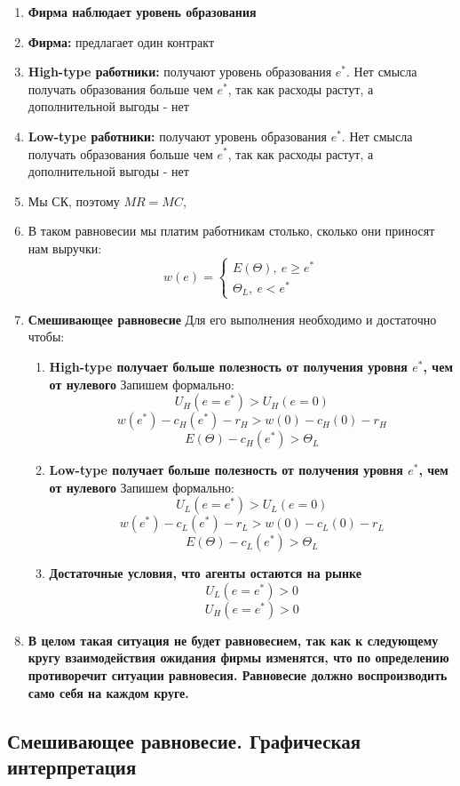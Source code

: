 \begin{enumerate}
    \item \textbf{Фирма наблюдает уровень образования}
    \item \textbf{Фирма:} предлагает один контракт
    \item \textbf{High-type работники:} получают уровень образования $e^*$. Нет смысла получать образования больше чем $e^*$, так как расходы растут, а дополнительной выгоды - нет
    \item \textbf{Low-type работники:} получают уровень образования $e^*$. Нет смысла получать образования больше чем $e^*$, так как расходы растут, а дополнительной выгоды - нет
    \item Мы СК, поэтому $MR=MC$,
    \item В таком равновесии мы платим работникам столько, сколько они приносят нам выручки: $$w(e)=\begin{cases}
        E(\Theta), \ e \geq e^* \\
        \Theta_L, \ e < e^*
    \end{cases}$$
    \item \textbf{Смешивающее равновесие} Для его выполнения необходимо и достаточно чтобы:\begin{enumerate}
        \item \textbf{High-type получает больше полезность от получения уровня $e^*$, чем от нулевого} Запишем формально:$$U_H(e=e^*)>U_H(e=0)$$
        $$w(e^*)-c_H(e^*)-r_H>w(0)-c_H(0)-r_H$$
        $$E(\Theta)-c_H(e^*)>\Theta_L$$
        \item \textbf{Low-type получает больше полезность от получения уровня $e^*$, чем от нулевого} Запишем формально:$$U_L(e=e^*)>U_L(e=0)$$
        $$w(e^*)-c_L(e^*)-r_L>w(0)-c_L(0)-r_L$$
        $$E(\Theta)-c_L(e^*)>\Theta_L$$
        \item \textbf{Достаточные условия, что агенты остаются на рынке} $$U_L(e=e^*)>0$$
        $$U_H(e=e^*)>0$$
    \end{enumerate}
    \item \textbf{В целом такая ситуация не будет равновесием, так как к следующему кругу взаимодействия ожидания фирмы изменятся, что по определению противоречит ситуации равновесия. Равновесие должно воспроизводить само себя на каждом круге.}
\end{enumerate}

\subsection{Смешивающее равновесие. Графическая интерпретация}

